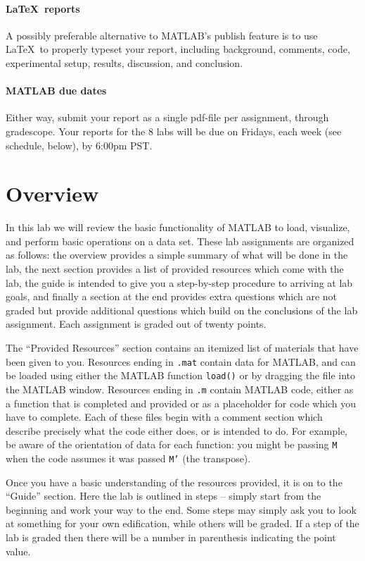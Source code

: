 \documentclass[11pt,noanswers,addpoints]{exam}
\begin{document}
\paragraph{\LaTeX\ reports}
A possibly preferable alternative to MATLAB's publish feature is to use \LaTeX\ to properly typeset your report, including background, comments, code, experimental setup, results, discussion, and conclusion.

\paragraph{MATLAB due dates}
Either way, submit your report as a single pdf-file per assignment, through gradescope. Your reports for the 8 labs will be due on Fridays, each week (see schedule, below), by 6:00pm PST. 

\section{Overview}

In this lab we will review the basic functionality of MATLAB to load, visualize, and perform
basic operations on a data set. These lab assignments are organized as follows: the overview
provides a simple summary of what will be done in the lab, the next section provides a list of
provided resources which come with the lab, the guide is intended to give you a step-by-step 
procedure to arriving at lab goals, and finally a section at the end provides extra questions which
are not graded but provide additional questions which build on the conclusions of the lab assignment.
Each assignment is graded out of twenty points.

The ``Provided Resources'' section contains an itemized list of materials that have been given to you.
Resources ending in \texttt{.mat} contain data for MATLAB, and can be loaded using either the MATLAB
function \texttt{load()} or by dragging the file into the MATLAB window. Resources ending in 
\texttt{.m} contain MATLAB code, either as a function that is completed and provided or as a
placeholder for code which you have to complete. Each of these files begin with a comment section
which describe precisely what the code either does, or is intended to do. For example, be aware of
the orientation of data for each function: you might be passing \texttt{M} when the code assumes
it was passed \texttt{M'} (the transpose).

Once you have a basic understanding of the resources provided, it is on to the ``Guide'' section. 
Here the lab is outlined in steps -- simply start from the beginning and work your way to the end.
Some steps may simply ask you to look at something for your own edification, while others will be
graded. If a step of the lab is graded then there will be a number in parenthesis indicating the
point value. 
\end{document}
